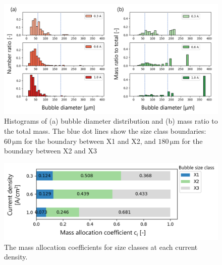 \documentclass[3p, twocolumn, 10pt]{elsarticle}
\begin{document}
\begin{figure}[h]
  \centering
  \includegraphics[width=1\linewidth]{Untitled 2.png}
  \caption{Histograms of (a) bubble diameter distribution and (b) mass ratio to the total mass. The blue dot lines show the size class boundaries: $60\,\si{\micro\metre}$ for the boundary between X1 and X2, and $180\,\si{\micro\metre}$ for the boundary between X2 and X3}
  \label{fig:histogram}
\end{figure}
\begin{figure}[h]
  \centering
  \includegraphics[width=1\linewidth]{Untitled 3.png}
  \caption{The mass allocation coefficients for size classes at each current density.}
  \label{fig:ci}
\end{figure}
\end{document}
